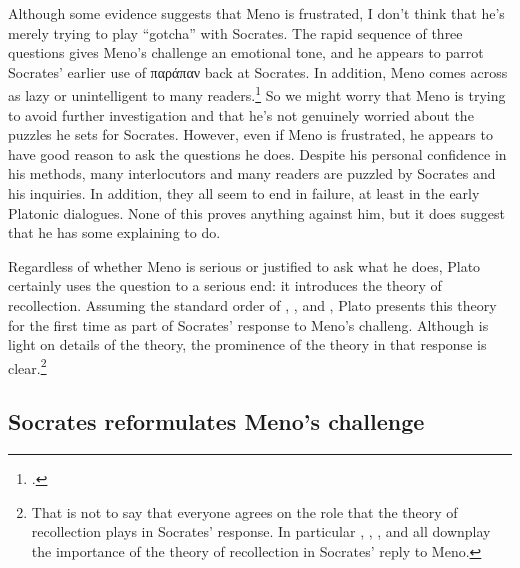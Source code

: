 Although some evidence suggests that Meno is frustrated, I don't think that he's merely trying to play ``gotcha'' with Socrates. The rapid sequence of three questions gives Meno's challenge an emotional tone, and he appears to parrot Socrates' earlier use of {\g παράπαν} back at Socrates. In addition, Meno comes across as lazy or unintelligent to many readers.\footcites[E.g.,][60--65]{scott2006}[and the authors cited in][3]{nehamas1985} So we might worry that Meno is trying to avoid further investigation and that he's not genuinely worried about the puzzles he sets for Socrates. However, even if Meno is frustrated, he appears to have good reason to ask the questions he does. Despite his personal confidence in his methods, many interlocutors and many readers are puzzled by Socrates and his inquiries. In addition, they all seem to end in failure, at least in the early Platonic dialogues. None of this proves anything against him, but it does suggest that he has some explaining to do.

Regardless of whether Meno is serious or justified to ask what he does, Plato certainly uses the question to a serious end: it introduces the theory of recollection. Assuming the standard order of , , and , Plato presents this theory for the first time as part of Socrates' response to Meno's challeng. Although  is light on details of the theory, the prominence of the theory in that response is clear.\footnote{That is not to say that everyone agrees on the role that the theory of recollection plays in Socrates' response. In particular \smartcite{irwin1977}, \smartcite{fine1992}, \smartcite{irwin1995}, and \smartcite{scott2006} all downplay the importance of the theory of recollection in Socrates' reply to Meno.}

\subsection{Socrates reformulates Meno's challenge}




